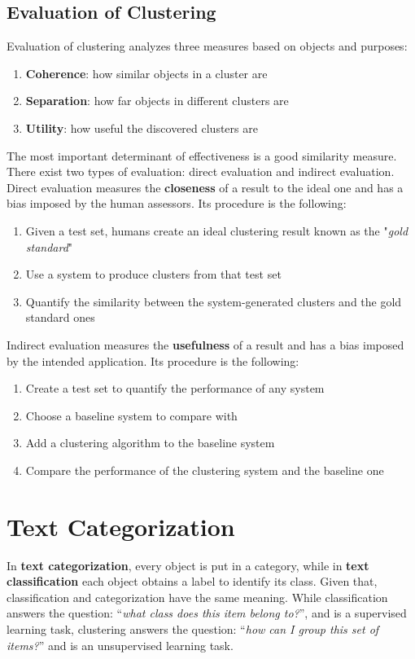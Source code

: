 \documentclass{article}
\begin{document}
\subsection{Evaluation of Clustering}
Evaluation of clustering analyzes three measures based on objects and purposes:
\begin{enumerate}
    \item \textbf{Coherence}: how similar objects in a cluster are
    \item \textbf{Separation}: how far objects in different clusters are
    \item \textbf{Utility}: how useful the discovered clusters are
\end{enumerate}
The most important determinant of effectiveness is a good similarity measure. There exist two types of evaluation: direct evaluation and indirect evaluation. \\
Direct evaluation measures the \textbf{closeness} of a result to the ideal one and has a bias imposed by the human assessors. Its procedure is the following:
\begin{enumerate}
    \item Given a test set, humans create an ideal clustering result known as the "\textit{gold standard}"
    \item Use a system to produce clusters from that test set
    \item Quantify the similarity between the system-generated clusters and the gold standard ones
\end{enumerate}
Indirect evaluation measures the \textbf{usefulness} of a result and has a bias imposed by the intended application. Its procedure is the following:
\begin{enumerate}
    \item Create a test set to quantify the performance of any system
    \item Choose a baseline system to compare with
    \item Add a clustering algorithm to the baseline system
    \item Compare the performance of the clustering system and the baseline one
\end{enumerate}

\newpage

\section{Text Categorization}
In \textbf{text categorization}, every object is put in a category, while in \textbf{text classification} each object obtains a label to identify its class. Given that, classification and categorization have the same meaning.
While classification answers the question: “\textit{what class does this item belong to?}”, and is a supervised learning task, clustering answers the question: “\textit{how can I group this set of items?}” and is an unsupervised learning task.
\end{document}
